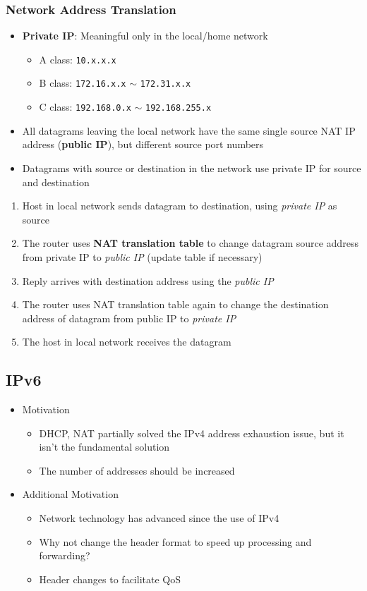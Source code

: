 \subsubsection{Network Address Translation}
\begin{itemize}
	\item \textbf{Private IP}: Meaningful only in the local/home network
	\begin{itemize}
		\item A class: \texttt{10.x.x.x}
		\item B class: \texttt{172.16.x.x} \(\sim\) \texttt{172.31.x.x}
		\item C class: \texttt{192.168.0.x} \(\sim\) \texttt{192.168.255.x}
	\end{itemize}
	\item All datagrams leaving the local network have the same single source NAT IP address (\textbf{public IP}), but different source port numbers
	\item Datagrams with source or destination in the network use private IP for source and destination
\end{itemize}

\begin{enumerate}
	\item Host in local network sends datagram to destination, using \textit{private IP} as source
	\item The router uses \textbf{NAT translation table} to change datagram source address from private IP to \textit{public IP} (update table if necessary)
	\item Reply arrives with destination address using the \textit{public IP}
	\item The router uses NAT translation table again to change the destination address of datagram from public IP to \textit{private IP}
	\item The host in local network receives the datagram
\end{enumerate}

\subsection{IPv6}
\begin{itemize}
	\item Motivation
	\begin{itemize}
		\item DHCP, NAT partially solved the IPv4 address exhaustion issue, but it isn't the fundamental solution
		\item The number of addresses should be increased
	\end{itemize}
	\item Additional Motivation
	\begin{itemize}
		\item Network technology has advanced since the use of IPv4
		\item Why not change the header format to speed up processing and forwarding?
		\item Header changes to facilitate QoS
	\end{itemize}
\end{itemize}

